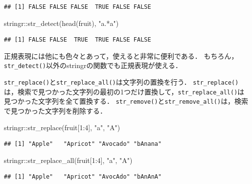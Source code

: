 \documentclass[
]{article}
\newenvironment{Shaded}{\begin{snugshade}}{\end{snugshade}}
\newcommand{\DecValTok}[1]{\textcolor[rgb]{0.00,0.00,0.81}{#1}}
\newcommand{\FunctionTok}[1]{\textcolor[rgb]{0.00,0.00,0.00}{#1}}
\newcommand{\NormalTok}[1]{#1}
\newcommand{\SpecialCharTok}[1]{\textcolor[rgb]{0.00,0.00,0.00}{#1}}
\newcommand{\StringTok}[1]{\textcolor[rgb]{0.31,0.60,0.02}{#1}}
\begin{document}
\begin{verbatim}
## [1] FALSE FALSE FALSE  TRUE FALSE FALSE
\end{verbatim}

\begin{Shaded}
\begin{Highlighting}[]
\NormalTok{stringr}\SpecialCharTok{::}\FunctionTok{str\_detect}\NormalTok{(}\FunctionTok{head}\NormalTok{(fruit), }\StringTok{"a.*a"}\NormalTok{)}
\end{Highlighting}
\end{Shaded}

\begin{verbatim}
## [1] FALSE FALSE  TRUE  TRUE FALSE FALSE
\end{verbatim}

正規表現には他にも色々とあって，使えると非常に便利である．
もちろん，\texttt{str\_detect()}以外のstringrの関数でも正規表現が使える．

\texttt{str\_replace()}と\texttt{str\_replace\_all()}は文字列の置換を行う．
\texttt{str\_replace()}は，検索で見つかった文字列の最初の1つだけ置換して，\texttt{str\_replace\_all()}は見つかった文字列を全て置換する．
\texttt{str\_remove()}と\texttt{str\_remove\_all()}は，検索で見つかった文字列を削除する．

\begin{Shaded}
\begin{Highlighting}[]
\NormalTok{stringr}\SpecialCharTok{::}\FunctionTok{str\_replace}\NormalTok{(fruit[}\DecValTok{1}\SpecialCharTok{:}\DecValTok{4}\NormalTok{], }\StringTok{"a"}\NormalTok{, }\StringTok{"A"}\NormalTok{)}
\end{Highlighting}
\end{Shaded}

\begin{verbatim}
## [1] "Apple"   "Apricot" "Avocado" "bAnana"
\end{verbatim}

\begin{Shaded}
\begin{Highlighting}[]
\NormalTok{stringr}\SpecialCharTok{::}\FunctionTok{str\_replace\_all}\NormalTok{(fruit[}\DecValTok{1}\SpecialCharTok{:}\DecValTok{4}\NormalTok{], }\StringTok{"a"}\NormalTok{, }\StringTok{"A"}\NormalTok{)}
\end{Highlighting}
\end{Shaded}

\begin{verbatim}
## [1] "Apple"   "Apricot" "AvocAdo" "bAnAnA"
\end{verbatim}
\end{document}

